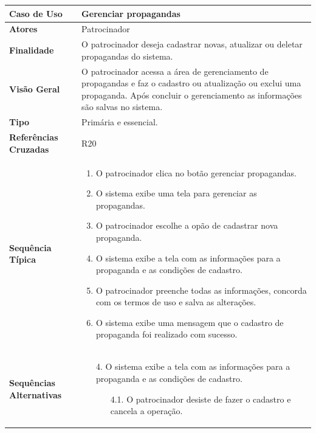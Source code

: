 \documentclass[a4paper,11pt]{article}
\begin{document}
\begin{table}[H]
		\begin{tabularx}{\textwidth}{|l|X|}
		\hline
			\textbf{Caso de Uso} &  Gerenciar propagandas \\ \hline
			\textbf{Atores} & Patrocinador   \\ \hline
			\textbf{Finalidade} &  O patrocinador deseja cadastrar novas, atualizar ou deletar propagandas do sistema. \\ \hline
			\textbf{Visão Geral} &  O patrocinador acessa a área de gerenciamento de propagandas e faz o cadastro ou atualização ou exclui uma propaganda. Após concluir o gerenciamento as informações são salvas no sistema. \\ \hline
			\textbf{Tipo} & Primária e essencial. \\ \hline
			\textbf{Referências Cruzadas} &  R20 \\ \hline
			\textbf{Sequência Típica} & 
			\begin{enumerate}
			\item O patrocinador clica no botão gerenciar propagandas.
			\item O sistema exibe uma tela para gerenciar as propagandas.
			\item O patrocinador escolhe a opão de cadastrar nova propaganda.
			\item O sistema exibe a tela com as informações para a propaganda e as condições de cadastro.	
			\item O patrocinador preenche todas as informações, concorda com os termos de uso e salva as alterações.
			\item O sistema exibe uma mensagem que o cadastro de propaganda foi realizado com sucesso.
			\end{enumerate} \\ \hline
			
			\textbf{Sequências Alternativas} & 
			\begin{itemize}
				\item[4.] O sistema exibe a tela com as informações para a propaganda e as condições de cadastro.
				\begin{itemize}
					\item[4.1.] O patrocinador desiste de fazer o cadastro e cancela a operação.
				\end{itemize}
			\end{itemize} \\ \hline
		\end{tabularx}
\end{table}
\end{document}
